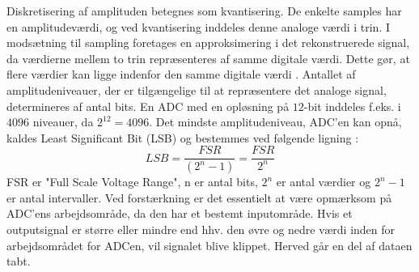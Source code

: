 Diskretisering af amplituden betegnes som kvantisering. De enkelte samples har en amplitudeværdi, og ved kvantisering inddeles denne analoge værdi i trin. I modsætning til sampling foretages en approksimering i det rekonstruerede signal, da værdierne mellem to trin repræsenteres af samme digitale værdi. Dette gør, at flere værdier kan ligge indenfor den samme digitale værdi \cite{Zouridakis2003}. Antallet af amplitudeniveauer, der er tilgængelige til at repræsentere det analoge signal, determineres af antal bits. En ADC med en opløsning på $12$-bit inddeles f.eks. i $4096$ niveauer, da $2^{12}=4096$. \cite{Konrad2006} Det mindste amplitudeniveau, ADC'en kan opnå, kaldes Least Significant Bit (LSB) og bestemmes ved følgende ligning \cite{webster2009,Wolf2004,Aminoff2012}:
\begin{equation}\label{ligningLSB}
LSB = \frac{FSR}{(2^{n}-1)} = \frac{FSR}{2^{n}}
\end{equation}
FSR er "Full Scale Voltage Range", n er antal bits, $2^n$ er antal værdier og $2^{n}-1$ er antal intervaller. 
\noindent Ved forstærkning er det essentielt at være opmærksom på ADC'ens arbejdsområde, da den har et bestemt inputområde. Hvis et outputsignal er større eller mindre end hhv. den øvre og nedre værdi inden for arbejdsområdet for ADCen, vil signalet blive klippet. Herved går en del af dataen tabt. \cite{webster2009,Wolf2004,Aminoff2012}